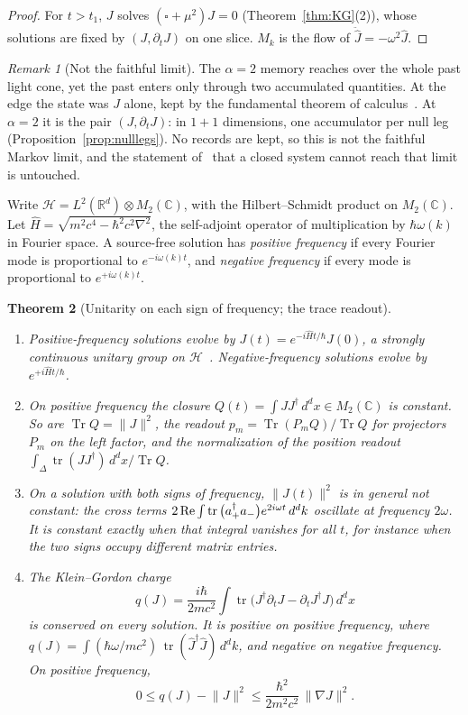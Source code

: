 \documentclass[11pt]{amsart}
\newtheorem{theorem}{Theorem}[section]
\theoremstyle{definition}
\theoremstyle{remark}
\newtheorem{remark}[theorem]{Remark}
\newcommand{\Hil}{\mathcal H}
\newcommand{\tr}{\operatorname{tr}}
\newcommand{\Tr}{\operatorname{Tr}}
\begin{document}
\begin{proof}
For $t>t_1$, $J$ solves $(\square+\mu^2)J=0$ (Theorem~\ref{thm:KG}(2)), whose solutions are fixed by $(J,\partial_tJ)$ on one slice. $M_k$ is the flow of $\ddot{\hat J}=-\omega^2\hat J$.
\end{proof}

\begin{remark}[Not the faithful limit]\label{rem:faithful}
The $\alpha=2$ memory reaches over the whole past light cone, yet the past enters only through two accumulated quantities. At the edge the state was $J$ alone, kept by the fundamental theorem of calculus~\cite[Prop.~6.1]{Edge}. At $\alpha=2$ it is the pair $(J,\partial_tJ)$: in $1+1$ dimensions, one accumulator per null leg (Proposition~\ref{prop:nulllegs}). No records are kept, so this is not the faithful Markov limit, and the statement of~\cite{Edge} that a closed system cannot reach that limit is untouched.
\end{remark}

Write $\Hil=L^2(\mathbb R^d)\otimes M_2(\mathbb C)$, with the Hilbert--Schmidt product on $M_2(\mathbb C)$. Let $\hat H=\sqrt{m^2c^4-\hbar^2c^2\nabla^2}$, the self-adjoint operator of multiplication by $\hbar\omega(k)$ in Fourier space. A source-free solution has \emph{positive frequency} if every Fourier mode is proportional to $e^{-i\omega(k)t}$, and \emph{negative frequency} if every mode is proportional to $e^{+i\omega(k)t}$.

\begin{theorem}[Unitarity on each sign of frequency; the trace readout]\label{thm:unitary}
\begin{enumerate}
\item Positive-frequency solutions evolve by $J(t)=e^{-i\hat Ht/\hbar}J(0)$, a strongly continuous unitary group on $\Hil$~\cite{Stone,RS1}. Negative-frequency solutions evolve by $e^{+i\hat Ht/\hbar}$.
\item On positive frequency the closure $Q(t)=\int JJ^\dagger\,d^dx\in M_2(\mathbb C)$ is constant. So are $\Tr Q=\lVert J\rVert^2$, the readout $p_m=\Tr(P_mQ)/\Tr Q$ for projectors $P_m$ on the left factor, and the normalization of the position readout $\int_\Delta\tr(JJ^\dagger)\,d^dx/\Tr Q$.
\item On a solution with both signs of frequency, $\lVert J(t)\rVert^2$ is in general not constant: the cross terms $2\,{\rm Re}\int\tr\big(a_+^\dagger a_-\big)e^{2i\omega t}\,d^dk$ oscillate at frequency $2\omega$. It is constant exactly when that integral vanishes for all $t$, for instance when the two signs occupy different matrix entries.
\item The Klein--Gordon charge
\[
q(J)=\frac{i\hbar}{2mc^2}\int\tr\big(J^\dagger\partial_tJ-\partial_tJ^\dagger J\big)\,d^dx
\]
is conserved on every solution. It is positive on positive frequency, where $q(J)=\int(\hbar\omega/mc^2)\,\tr(\hat J^\dagger\hat J)\,d^dk$, and negative on negative frequency. On positive frequency,
\[
0\le q(J)-\lVert J\rVert^2\le\frac{\hbar^2}{2m^2c^2}\,\lVert\nabla J\rVert^2 .
\]
\end{enumerate}
\end{theorem}
\end{document}
